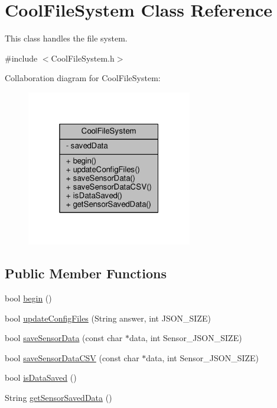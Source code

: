 \hypertarget{classCoolFileSystem}{}\section{Cool\+File\+System Class Reference}
\label{classCoolFileSystem}


This class handles the file system.  




{\ttfamily \#include $<$Cool\+File\+System.\+h$>$}



Collaboration diagram for Cool\+File\+System\+:
\nopagebreak
\begin{figure}[H]
\begin{center}
\leavevmode
\includegraphics[width=205pt]{classCoolFileSystem__coll__graph}
\end{center}
\end{figure}
\subsection*{Public Member Functions}
\begin{DoxyCompactItemize}
\item 
bool \hyperlink{classCoolFileSystem_a6ba6f666ed4c530174f8569d2c636748}{begin} ()
\item 
bool \hyperlink{classCoolFileSystem_a32dad79ae80182a83e2e8f52286b7c7b}{update\+Config\+Files} (String answer, int J\+S\+O\+N\+\_\+\+S\+I\+ZE)
\item 
bool \hyperlink{classCoolFileSystem_a4c560c2ddd40b74b7758e6ceb2c58957}{save\+Sensor\+Data} (const char $\ast$data, int Sensor\+\_\+\+J\+S\+O\+N\+\_\+\+S\+I\+ZE)
\item 
bool \hyperlink{classCoolFileSystem_af5a51e2b9bb6e7e7edf75a508fe75f82}{save\+Sensor\+Data\+C\+SV} (const char $\ast$data, int Sensor\+\_\+\+J\+S\+O\+N\+\_\+\+S\+I\+ZE)
\item 
bool \hyperlink{classCoolFileSystem_a5a7eaeea7a9fbf8aaef651d862fa3b5b}{is\+Data\+Saved} ()
\item 
String \hyperlink{classCoolFileSystem_a5c58bca3735c0ed3efb268d70ef998ef}{get\+Sensor\+Saved\+Data} ()
\end{DoxyCompactItemize}

